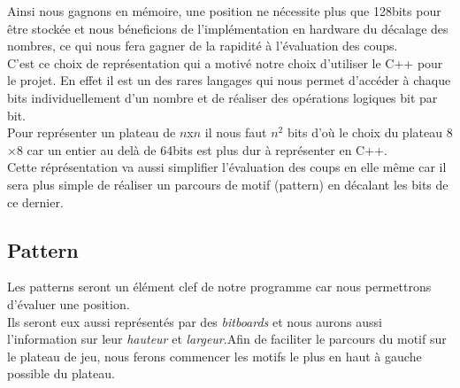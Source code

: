 \documentclass{article}
\begin{document}
Ainsi nous gagnons en mémoire, une position ne nécessite plus que 128bits pour être stockée
et nous béneficions de l'implémentation en hardware du décalage des nombres, ce qui nous fera
gagner de la rapidité à l'évaluation des coups.\\

C'est ce choix de représentation qui a motivé notre choix d'utiliser le C++ pour le projet.
En effet il est un des rares langages qui nous permet d'accéder à chaque bits individuellement
d'un nombre et de réaliser des opérations logiques bit par bit. \\
Pour représenter un plateau de $n$x$n$ il nous faut $n^2$ bits d'où le choix du plateau 8$\times$8
car un entier au delà de 64bits est plus dur à représenter en C++.\\

Cette réprésentation va aussi simplifier l'évaluation des coups en elle même car il sera
plus simple de réaliser un parcours de motif (pattern) en décalant les bits de ce dernier.

\pagebreak
\subsection{Pattern}

Les patterns seront un élément clef de notre programme car nous permettrons d'évaluer une position.\\
Ils seront eux aussi représentés par des \textit{bitboards} et nous aurons aussi l'information sur leur
\textit{hauteur} et \textit{largeur}.Afin de faciliter le parcours du motif sur le plateau de jeu, nous
ferons commencer les motifs le plus en haut à gauche possible du plateau.
\end{document}
